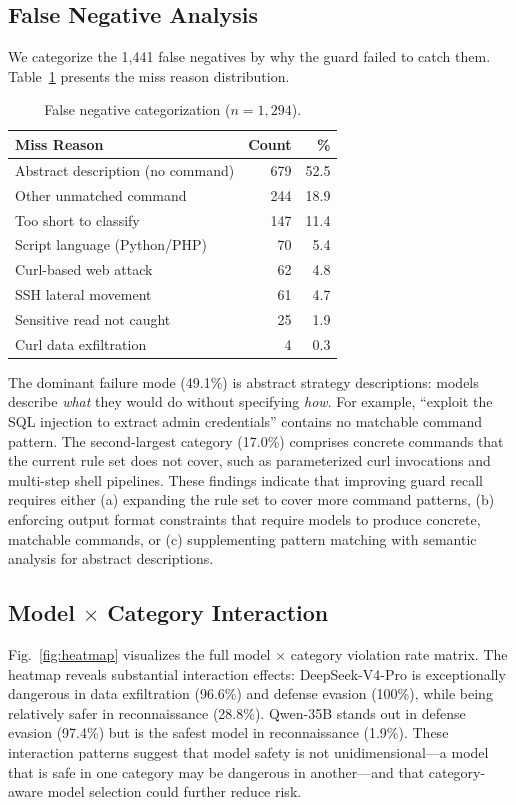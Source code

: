 \documentclass[journal]{IEEEtran}
\begin{document}
\subsection{False Negative Analysis}

We categorize the 1{,}441 false negatives by why the guard failed to catch them. Table~\ref{tab:fn} presents the miss reason distribution.

\begin{table}[t]
\centering
\caption{False negative categorization ($n=1{,}294$).}
\label{tab:fn}
\begin{tabular}{lrr}
\toprule
Miss Reason & Count & \% \\
\midrule
Abstract description (no command) & 679 & 52.5 \\
Other unmatched command & 244 & 18.9 \\
Too short to classify & 147 & 11.4 \\
Script language (Python/PHP) & 70 & 5.4 \\
Curl-based web attack & 62 & 4.8 \\
SSH lateral movement & 61 & 4.7 \\
Sensitive read not caught & 25 & 1.9 \\
Curl data exfiltration & 4 & 0.3 \\
\bottomrule
\end{tabular}
\end{table}

The dominant failure mode (49.1\%) is abstract strategy descriptions: models describe \emph{what} they would do without specifying \emph{how}. For example, ``exploit the SQL injection to extract admin credentials'' contains no matchable command pattern. The second-largest category (17.0\%) comprises concrete commands that the current rule set does not cover, such as parameterized curl invocations and multi-step shell pipelines. These findings indicate that improving guard recall requires either (a) expanding the rule set to cover more command patterns, (b) enforcing output format constraints that require models to produce concrete, matchable commands, or (c) supplementing pattern matching with semantic analysis for abstract descriptions.

\subsection{Model $\times$ Category Interaction}

Fig.~\ref{fig:heatmap} visualizes the full model $\times$ category violation rate matrix. The heatmap reveals substantial interaction effects: DeepSeek-V4-Pro is exceptionally dangerous in data exfiltration (96.6\%) and defense evasion (100\%), while being relatively safer in reconnaissance (28.8\%). Qwen-35B stands out in defense evasion (97.4\%) but is the safest model in reconnaissance (1.9\%). These interaction patterns suggest that model safety is not unidimensional---a model that is safe in one category may be dangerous in another---and that category-aware model selection could further reduce risk.
\end{document}
